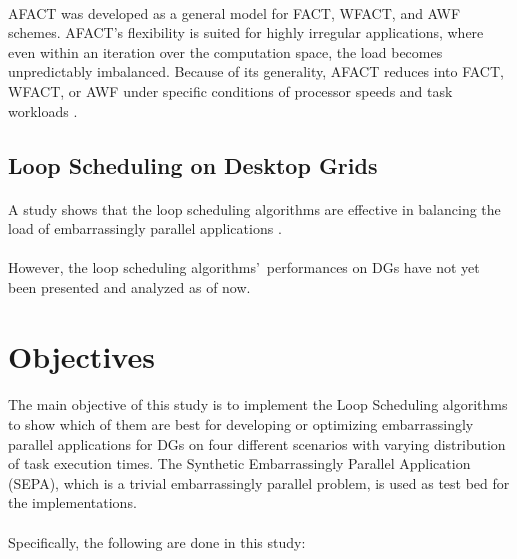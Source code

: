 \documentclass[10pt, twocolumn, letterpaper]{article}
\begin{document}
\paragraph{}
AFACT was developed as a general model for FACT, WFACT, and AWF schemes. AFACT’s flexibility is suited for highly irregular applications, where even within an iteration over the computation space, the load becomes unpredictably imbalanced. Because of its generality, AFACT reduces into FACT, WFACT, or AWF under specific conditions of processor speeds and task workloads \cite{pabico}.

\subsection{Loop Scheduling on Desktop Grids}

\paragraph{}
A study shows that the loop scheduling algorithms are effective in balancing the load of embarrassingly parallel applications \cite{pabico}.

\paragraph{}
However, the loop scheduling algorithms\rq\ performances on DGs have not yet been presented and analyzed as of now.

\section{Objectives}

\paragraph{}
The main objective of this study is to implement the Loop Scheduling algorithms to show which of them are best for developing or optimizing embarrassingly parallel applications for DGs on four different scenarios with varying distribution of task execution times. The Synthetic Embarrassingly Parallel Application (SEPA), which is a trivial embarrassingly parallel problem, is used as test bed for the implementations.

\paragraph{}
Specifically, the following are done in this study:
\end{document}
